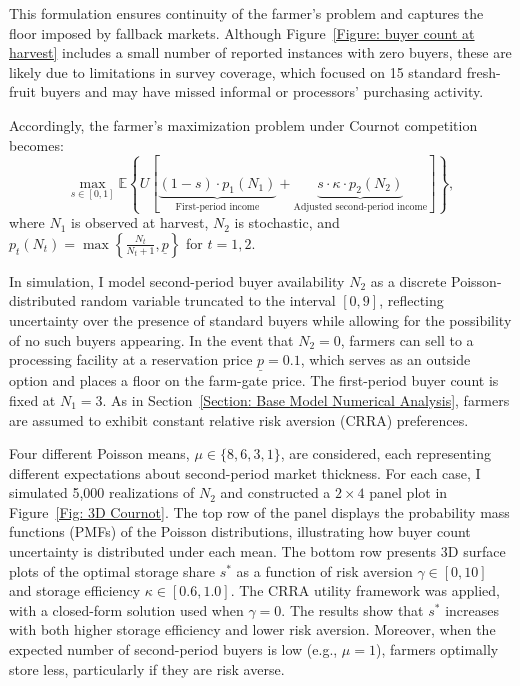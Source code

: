 This formulation ensures continuity of the farmer's problem and captures the floor imposed by fallback markets. Although Figure~\ref{Figure: buyer count at harvest} includes a small number of reported instances with zero buyers, these are likely due to limitations in survey coverage, which focused on 15 standard fresh-fruit buyers and may have missed informal or processors' purchasing activity.

Accordingly, the farmer's maximization problem under Cournot competition becomes:
\begin{equation}
\label{eq:Cournot objective function}
\max_{s \in [0,1]} \mathbb{E} \left\{ U \left[ 
\underbrace{(1-s) \cdot p_1(N_1)}_{\text{First-period income}} 
+ \underbrace{s \cdot \kappa \cdot p_2(N_2)}_{\text{Adjusted second-period income}} 
\right] \right\},
\end{equation}
where $N_1$ is observed at harvest, $N_2$ is stochastic, and 
$p_t(N_t) = \max\left\{ \tfrac{N_t}{N_t + 1}, \underline{p} \right\}$ for $t = 1,2$. 


In simulation, I model second-period buyer availability $N_2$ as a discrete Poisson-distributed random variable truncated to the interval $[0,9]$, reflecting uncertainty over the presence of standard buyers while allowing for the possibility of no such buyers appearing. In the event that $N_2 = 0$, farmers can sell to a processing facility at a reservation price $\underline{p} = 0.1$, which serves as an outside option and places a floor on the farm-gate price. The first-period buyer count is fixed at $N_1 = 3$. As in Section~\ref{Section: Base Model Numerical Analysis}, farmers are assumed to exhibit constant relative risk aversion (CRRA) preferences.

Four different Poisson means, $\mu \in \{8, 6, 3, 1\}$, are considered, each representing different expectations about second-period market thickness. For each case, I simulated 5,000 realizations of $N_2$ and constructed a $2\times4$ panel plot in Figure~\ref{Fig: 3D Cournot}. The top row of the panel displays the probability mass functions (PMFs) of the Poisson distributions, illustrating how buyer count uncertainty is distributed under each mean. The bottom row presents 3D surface plots of the optimal storage share $s^*$ as a function of risk aversion $\gamma \in [0,10]$ and storage efficiency $\kappa \in [0.6, 1.0]$. The CRRA utility framework was applied, with a closed-form solution used when $\gamma = 0$. The results show that $s^*$ increases with both higher storage efficiency and lower risk aversion. Moreover, when the expected number of second-period buyers is low (e.g., $\mu = 1$), farmers optimally store less, particularly if they are risk averse.

